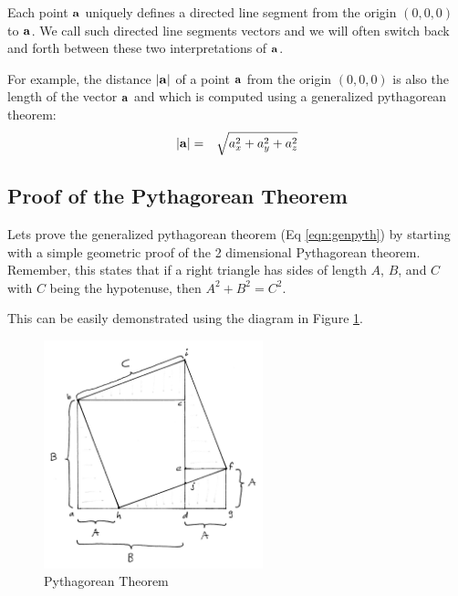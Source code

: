 \documentclass{book}
\newcommand{\vect}[1]{{\bf{ #1}}}
\begin{document}
Each point $\vect{a}$ uniquely defines a directed line segment from the origin $(0,0,0)$ to $\vect{a}$.
We call such directed line segments vectors and we will often switch back and forth between these two
interpretations of $\vect{a}$.


For example,
the distance $\vert\vect{a}\vert$ of a point $\vect{a}$ from the origin $(0,0,0)$ is also the
length of the vector $\vect{a}$
and which is computed using a generalized pythagorean theorem:
\begin{eqnarray}
\vert\vect{a}\vert &=& \sqrt{a_x^2 + a_y^2 + a_z^2}
\label{eqn:genpyth}
\end{eqnarray}

\subsection{Proof of the Pythagorean Theorem}
Lets prove the generalized pythagorean theorem (Eq \ref{eqn:genpyth}) by starting with a simple
geometric proof of the 2 dimensional Pythagorean theorem. Remember, this states that if a right triangle
has sides of length $A$, $B$, and $C$ with $C$ being the hypotenuse, then $A^2 + B^2 = C^2$.

This can be easily demonstrated using the diagram in Figure \ref{fig:pyth2da}.

\begin{figure}[h]
\centering
\includegraphics[width=2.5in]{images/pyth2da.jpg}
\caption{Pythagorean Theorem \label{fig:pyth2da}}
\end{figure}
\end{document}

